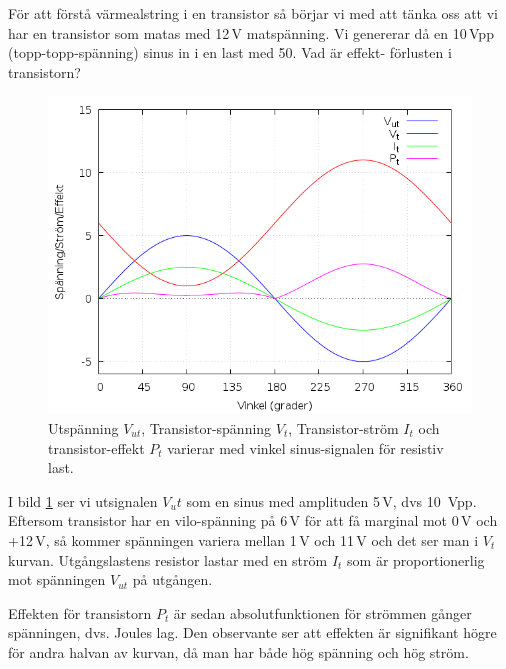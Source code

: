 För att förstå värmealstring i en transistor så börjar vi med att tänka oss
att vi har en transistor som matas med 12\,V matspänning. Vi genererar då en
10\,Vpp (topp-topp-spänning) sinus in i en last med \SI{50}{\Omega}. Vad är effekt-
förlusten i transistorn?

\begin{figure}
\begin{center}
\includegraphics[width=.85\textwidth]{images/power1.png}
\caption{Utspänning $V_{ut}$, Transistor-spänning $V_t$, Transistor-ström $I_t$ och transistor-effekt $P_t$ varierar med vinkel sinus-signalen för resistiv last.}
\label{fig:power1}
\end{center}
\end{figure}

I bild \ref{fig:power1} ser vi utsignalen \(V_ut\) som en sinus med
amplituden 5\,V, dvs \SI{10}{Vpp}. Eftersom transistor har en vilo-spänning på
6\,V för att få marginal mot 0\,V och +12\,V, så kommer spänningen variera
mellan 1\,V och 11\,V och det ser man i \(V_t\) kurvan. Utgångslastens resistor
lastar med en ström \(I_t\) som är proportionerlig mot spänningen \(V_{ut}\) på
utgången.

Effekten för transistorn \(P_t\) är sedan absolutfunktionen för strömmen gånger
spänningen, dvs. Joules lag. Den observante ser att effekten är signifikant
högre för andra halvan av kurvan, då man har både hög spänning och hög ström.
